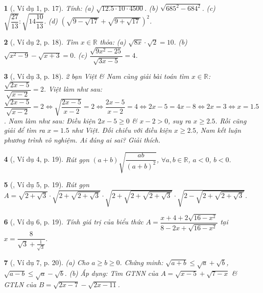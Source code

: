 \documentclass{article}
\newtheorem{baitoan}{}
\begin{document}
\begin{baitoan}[\cite{Binh_boi_duong_Toan_9_tap_1}, Ví dụ 1, p. 17]
	Tính: (a) $\sqrt{12.5\cdot10\cdot4500}$. (b) $\sqrt{685^2 - 684^2}$. (c) $\sqrt{\dfrac{27}{13}}:\sqrt{14\dfrac{10}{13}}$. (d) $\left(\sqrt{9 - \sqrt{17}} + \sqrt{9 + \sqrt{17}}\right)^2$.
\end{baitoan}

\begin{baitoan}[\cite{Binh_boi_duong_Toan_9_tap_1}, Ví dụ 2, p. 18]
	Tìm $x\in\mathbb{R}$ thỏa: (a) $\sqrt{8x}\cdot\sqrt{2} = 10$. (b) $\sqrt{x^2 - 9} - \sqrt{x + 3} = 0$. (c) $\dfrac{\sqrt{9x^2 - 25}}{\sqrt{3x - 5}} = 4$.
\end{baitoan}

\begin{baitoan}[\cite{Binh_boi_duong_Toan_9_tap_1}, Ví dụ 3, p. 18]
	2 bạn Việt \& Nam cùng giải bài toán tìm $x\in\mathbb{R}$: $\dfrac{\sqrt{2x - 5}}{\sqrt{x - 2}} = 2$. Việt làm như sau: $\dfrac{\sqrt{2x - 5}}{\sqrt{x - 2}} = 2\Leftrightarrow\sqrt{\dfrac{2x - 5}{x - 2}} = 2\Leftrightarrow\dfrac{2x - 5}{x - 2} = 4\Leftrightarrow2x - 5 = 4x - 8\Leftrightarrow2x = 3\Leftrightarrow x = 1.5$. Nam làm như sau: Điều kiện $2x - 5\ge0$ \& $x - 2> 0$, suy ra $x\ge2.5$. Rồi cũng giải để tìm ra $x = 1.5$ như Việt. Đối chiếu với điều kiện $x\ge2.5$, Nam kết luận phương trình vô nghiệm. Ai đúng ai sai? Giải thích.
\end{baitoan}

\begin{baitoan}[\cite{Binh_boi_duong_Toan_9_tap_1}, Ví dụ 4, p. 19]
	Rút gọn $(a + b)\sqrt{\dfrac{ab}{(a + b)^2}}$, $\forall a,b\in\mathbb{R}$, $a < 0$, $b < 0$.
\end{baitoan}

\begin{baitoan}[\cite{Binh_boi_duong_Toan_9_tap_1}, Ví dụ 5, p. 19]
	Rút gọn $A = \sqrt{2 + \sqrt{3}}\cdot \sqrt{2 + \sqrt{2 + \sqrt{3}}}\cdot\sqrt{2 + \sqrt{2 + \sqrt{2 + \sqrt{3}}}}\cdot\sqrt{2 - \sqrt{2 + \sqrt{2 + \sqrt{3}}}}$.
\end{baitoan}

\begin{baitoan}[\cite{Binh_boi_duong_Toan_9_tap_1}, Ví dụ 6, p. 19]
	Tính giá trị của biểu thức $A = \dfrac{x + 4 + 2\sqrt{16 - x^2}}{8 - 2x + \sqrt{16 - x^2}}$ tại $x = \dfrac{8}{\sqrt{3} + \frac{1}{\sqrt{3}}}$.
\end{baitoan}

\begin{baitoan}[\cite{Binh_boi_duong_Toan_9_tap_1}, Ví dụ 7, p. 20]
	(a) Cho $a\ge b\ge0$. Chứng minh: $\sqrt{a + b}\le\sqrt{a} + \sqrt{b}$, $\sqrt{a - b}\le\sqrt{a} - \sqrt{b}$. (b) Áp dụng: Tìm {\rm {\rm GTNN}} của $A = \sqrt{x - 5} + \sqrt{7 - x}$ \& {\rm GTLN} của $B = \sqrt{2x - 7} - \sqrt{2x - 11}$.
\end{baitoan}
\end{document}
